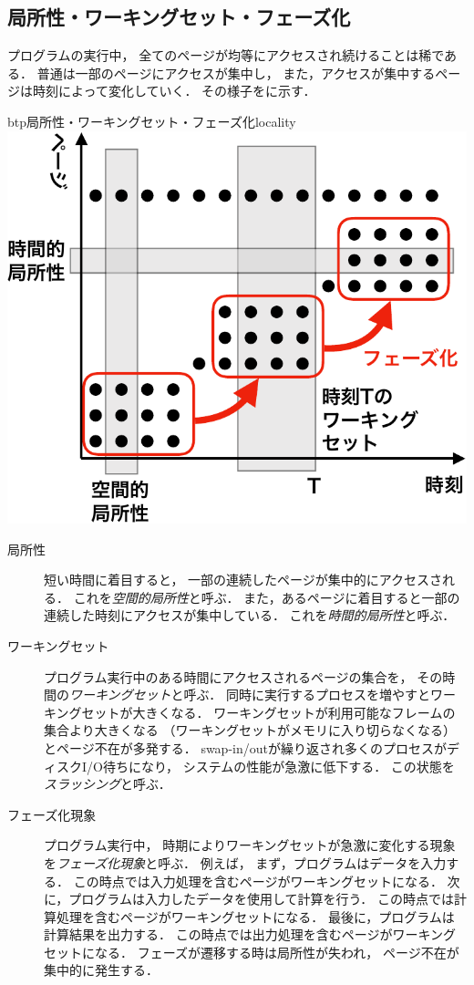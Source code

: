 \subsection{局所性・ワーキングセット・フェーズ化}
プログラムの実行中，
全てのページが均等にアクセスされ続けることは稀である．
普通は一部のページにアクセスが集中し，
また，アクセスが集中するページは時刻によって変化していく．
その様子をに示す．

\begin{myfig}{btp}{局所性・ワーキングセット・フェーズ化}{locality}
  \includegraphics[scale=0.66]{Fig/locality-crop.pdf}
\end{myfig}

\begin{description}
\item[局所性]
  短い時間に着目すると，
  一部の連続したページが集中的にアクセスされる．
  これを\emph{空間的局所性}と呼ぶ．
  また，あるページに着目すると一部の連続した時刻にアクセスが集中している．
  これを\emph{時間的局所性}と呼ぶ．
\item[ワーキングセット]
  プログラム実行中のある時間にアクセスされるページの集合を，
  その時間の\emph{ワーキングセット}と呼ぶ．
  同時に実行するプロセスを増やすとワーキングセットが大きくなる．
  ワーキングセットが利用可能なフレームの集合より大きくなる
  （ワーキングセットがメモリに入り切らなくなる）とページ不在が多発する．
  swap-in/outが繰り返され多くのプロセスがディスクI/O待ちになり，
  システムの性能が急激に低下する．
  この状態を\emph{スラッシング}と呼ぶ．
\item[フェーズ化現象]
  プログラム実行中，
  時期によりワーキングセットが急激に変化する現象を\emph{フェーズ化現象}と呼ぶ．
  例えば，
  まず，プログラムはデータを入力する．
  この時点では入力処理を含むページがワーキングセットになる．
  次に，プログラムは入力したデータを使用して計算を行う．
  この時点では計算処理を含むページがワーキングセットになる．
  最後に，プログラムは計算結果を出力する．
  この時点では出力処理を含むページがワーキングセットになる．
  フェーズが遷移する時は局所性が失われ，
  ページ不在が集中的に発生する．
\end{description}

